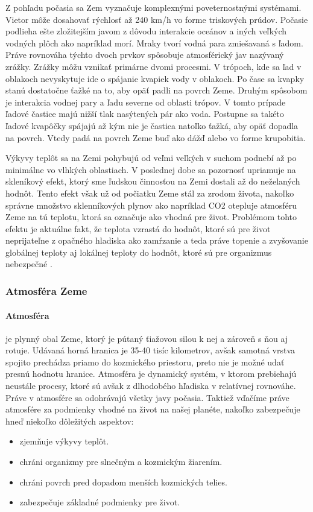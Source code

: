 Z pohľadu počasia sa Zem vyznačuje komplexnými poveternostnými systémami. Vietor môže dosahovať rýchlosť až 240 km/h vo forme triskových prúdov. Počasie podlieha ešte zložitejším javom z dôvodu interakcie oceánov a iných veľkých vodných plôch ako napríklad morí. Mraky tvorí vodná para zmiešavaná s ľadom. Práve rovnováha týchto dvoch prvkov spôsobuje atmosférický jav nazývaný zrážky. Zrážky môžu vznikať primárne dvomi procesmi. V trópoch, kde sa ľad v oblakoch nevyskytuje ide o spájanie kvapiek vody v oblakoch. Po čase sa kvapky stanú dostatočne ťažké na to, aby opäť padli na povrch Zeme. Druhým spôsobom je interakcia vodnej pary a ľadu severne od oblasti trópov. V tomto prípade ľadové častice majú nižší tlak nasýtených pár ako voda. Postupne sa takéto ľadové kvapôčky spájajú až kým nie je častica natoľko ťažká, aby opäť dopadla na povrch. Vtedy padá na povrch Zeme buď ako dážď alebo vo forme krupobitia.

Výkyvy teplôt sa na Zemi pohybujú od veľmi veľkých v suchom podnebí až po minimálne vo vlhkých oblastiach. V poslednej dobe sa pozornosť upriamuje na skleníkový efekt, ktorý sme ľudskou činnosťou na Zemi dostali až do neželaných hodnôt. Tento efekt však už od počiatku Zeme stál za zrodom života, nakoľko správne množstvo sklenníkových plynov ako napríklad CO2 otepluje atmosféru Zeme na tú teplotu, ktorá sa označuje ako vhodná pre život. Problémom tohto efektu je aktuálne fakt, že teplota vzrastá do hodnôt, ktoré sú pre život neprijateľne z opačného hladiska ako zamŕzanie a teda práve topenie a zvyšovanie globálnej teploty aj lokálnej teploty do hodnôt, ktoré sú pre organizmus nebezpečné \cite{meteo}.

\subsubsection{Atmosféra Zeme}
\label{atmosferaZeme}
\paragraph{Atmosféra}je plynný obal Zeme, ktorý je pútaný ťiažovou silou k nej a zároveň s ňou aj rotuje. Udávaná horná hranica je 35-40 tisíc kilometrov, avšak samotná vrstva spojito prechádza priamo do kozmického priestoru, preto nie je možné udať presnú hodnotu hranice. Atmosféra je dynamický systém, v ktorom prebiehajú neustále procesy, ktoré sú avšak z dlhodobého hľadiska v relatívnej rovnováhe. Práve v atmosfére sa odohrávajú všetky javy počasia. Taktiež vďačíme práve atmosfére za podmienky vhodné na život na našej planéte, nakoľko zabezpečuje hneď niekoľko dôležitých aspektov:
\begin{itemize}
  \item zjemňuje výkyvy teplôt.
  \item chráni organizmy pre slnečným a kozmickým žiarením.
  \item chráni povrch pred dopadom menších kozmických telies.
  \item zabezpečuje základné podmienky pre život.
\end{itemize}

